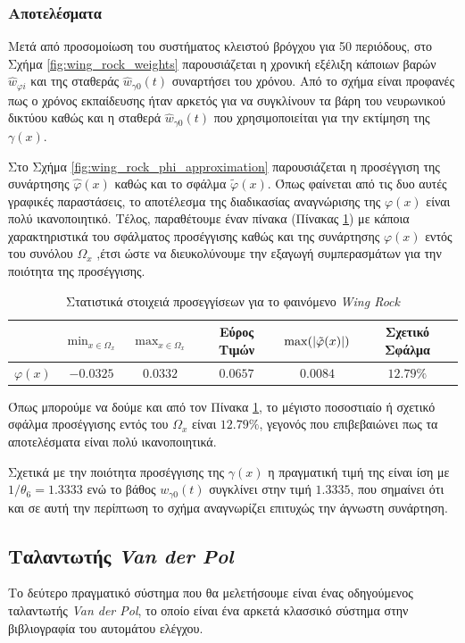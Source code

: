 \subsubsection{Αποτελέσματα}
Μετά από προσομοίωση του συστήματος κλειστού βρόγχου για 50 περιόδους, στο Σχήμα \ref{fig:wing_rock_weights} παρουσιάζεται η χρονική εξέλιξη κάποιων βαρών $\hat{w}_{\varphi i}$ και της σταθεράς $\hat{w}_{\gamma 0}(t)$ συναρτήσει του χρόνου. Από το σχήμα είναι προφανές πως ο χρόνος εκπαίδευσης ήταν αρκετός για να συγκλίνουν τα βάρη του νευρωνικού δικτύου καθώς και η σταθερά  $\hat{w}_{\gamma 0}(t)$ που χρησιμοποιείται για την εκτίμηση της $\gamma(x)$.

Στο Σχήμα \ref{fig:wing_rock_phi_approximation} παρουσιάζεται η προσέγγιση της συνάρτησης $\hat{\varphi}(x)$ καθώς και το σφάλμα $\tilde{\varphi}(x)$. Όπως φαίνεται από τις δυο αυτές γραφικές παραστάσεις, το αποτέλεσμα της διαδικασίας αναγνώρισης της $\varphi(x)$ είναι πολύ ικανοποιητικό. Τέλος, παραθέτουμε έναν πίνακα (Πίνακας \ref{tab:stat_of_function_wing_rock}) με κάποια χαρακτηριστικά του σφάλματος προσέγγισης καθώς και της συνάρτησης $\varphi(x)$ εντός του συνόλου $\Omega_x$ ,έτσι ώστε να διευκολύνουμε την εξαγωγή συμπερασμάτων για την ποιότητα της προσέγγισης.

\begin{table}
	\centering
	\begin{tabular}{  c | c | c | c | c | c }
		& $\min_{x \in \Omega_x}$ & $\max_{x \in \Omega_x}$ & Εύρος Τιμών & $\max(\abs{\tilde{\varphi}(x)})$ & Σχετικό Σφάλμα \\ \hline
		$\varphi(x)$ & $-0.0325$ & $0.0332$ & $0.0657$ & $0.0084$ & $12.79\%$ \\
	\end{tabular}
	\caption{Στατιστικά στοιχειά προσεγγίσεων για το φαινόμενο  \textit{Wing Rock}}
	\label{tab:stat_of_function_wing_rock}
\end{table}

Όπως μπορούμε να δούμε και από τον Πίνακα \ref{tab:stat_of_function_wing_rock}, το μέγιστο ποσοστιαίο ή σχετικό  σφάλμα προσέγγισης εντός του $\Omega_x$ είναι $12.79\%$, γεγονός που επιβεβαιώνει πως τα αποτελέσματα είναι πολύ ικανοποιητικά.

Σχετικά με την ποιότητα προσέγγισης της $\gamma(x)$ η πραγματική τιμή της είναι ίση με $1/\theta_6 = 1.3333$ ενώ το βάθος $w_{\gamma 0}(t)$ συγκλίνει στην τιμή $1.3335$, που σημαίνει ότι και σε αυτή την περίπτωση το σχήμα αναγνωρίζει επιτυχώς την άγνωστη συνάρτηση.


\subsection{Ταλαντωτής \textit{Van der Pol}}
\label{exp:vdp}
Το δεύτερο πραγματικό σύστημα που θα μελετήσουμε είναι ένας οδηγούμενος ταλαντωτής \textit{Van der Pol}, το οποίο είναι ένα αρκετά κλασσικό σύστημα στην βιβλιογραφία του αυτομάτου ελέγχου. 

